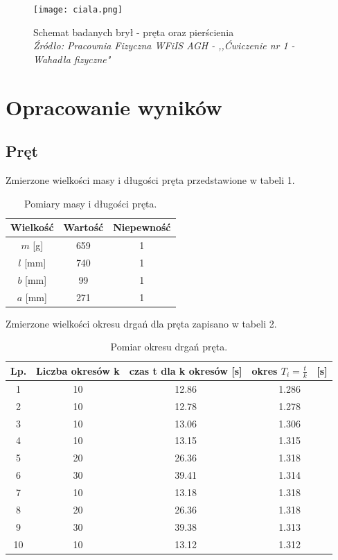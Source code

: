\documentclass[a4paper,12pts]{article}
\begin{document}
	\begin{figure}[!h]
		\centering
		\texttt{[image: ciala.png]}
		\caption{\centering Schemat badanych brył - pręta oraz pierścienia \\ \textit{Źródło: Pracownia Fizyczna WFiIS AGH - ,,Ćwiczenie nr 1 - Wahadła fizyczne"} }
		\label{ciala}
	\end{figure}


	\section{Opracowanie wyników}
	
	\subsection{Pręt}
	
	Zmierzone wielkości masy i długości pręta przedstawione w tabeli 1.
	
		\begin{table}[!h]
		\centering
		\begin{tabular}{ | c | c | c | }
			\hline
			\textrm{Wielkość} & \textrm{Wartość} & \textrm{Niepewność} \\ \hline
			$m$ [g] & 659 & 1  \\ \hline
			$l$ [mm] & 740 & 1  \\ \hline
			$b$ [mm] & 99 & 1  \\ \hline
			$a$ [mm]& 271 & 1  \\ \hline

		\end{tabular}
		\caption{Pomiary masy i długości pręta.}
		\label{Tabela1}	
	\end{table}
	
	Zmierzone wielkości okresu drgań dla pręta zapisano w tabeli 2.
	
	\begin{table}[!h]
		\centering
		\begin{tabular}{ | c | c | c | c | }
			\hline
			\textrm{Lp.} & \textrm{Liczba okresów } k & \textrm{czas } t \textrm{ dla } k \textrm{ okresów [s]} & \textrm{okres } $T_i= \frac{t}{k}$ \textrm{~[s]} \\ \hline
			1 & 10 & 12.86 & 1.286 \\ \hline
			2 & 10 & 12.78 & 1.278 \\ \hline
			3 & 10 & 13.06 & 1.306 \\ \hline
			4 & 10 & 13.15 & 1.315 \\ \hline
			5 & 20 & 26.36 & 1.318 \\ \hline
			6 & 30 & 39.41 & 1.314 \\ \hline
			7 & 10 & 13.18 & 1.318 \\ \hline
			8 & 20 & 26.36 & 1.318 \\ \hline
			9 & 30 & 39.38 & 1.313 \\ \hline
			10 & 10 & 13.12 & 1.312 \\ \hline
		\end{tabular}
		\caption{Pomiar okresu drgań pręta.}
		\label{Tabela2}	
	\end{table}
	
\end{document}
